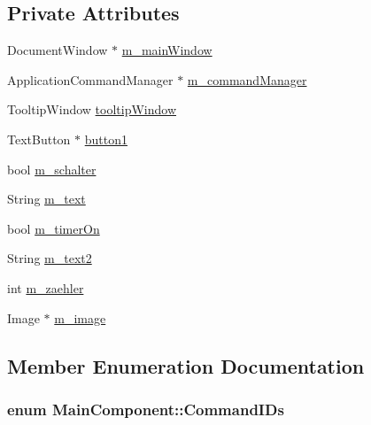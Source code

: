 \begin{CompactItemize}
\subsection*{Private Attributes}
\begin{CompactItemize}
\item 
DocumentWindow $\ast$ \hyperlink{class_main_component_0b3169c9c56934a40ddd86da63ed718f}{m\_\-mainWindow}
\item 
ApplicationCommandManager $\ast$ \hyperlink{class_main_component_a86edd452d1fcbf0528180809f26aefe}{m\_\-commandManager}
\item 
TooltipWindow \hyperlink{class_main_component_f44fee61fe0067ea2d901700a145e188}{tooltipWindow}
\item 
TextButton $\ast$ \hyperlink{class_main_component_b5d3edf82637368286e4a3785e8ebe2a}{button1}
\item 
bool \hyperlink{class_main_component_b98d304d55eabd66ae7bbc0ac3a1a424}{m\_\-schalter}
\item 
String \hyperlink{class_main_component_6f2ff91585d36c8b87e8a7429d792336}{m\_\-text}
\item 
bool \hyperlink{class_main_component_8b79fd199c028bd5a65cbde55fd8757c}{m\_\-timerOn}
\item 
String \hyperlink{class_main_component_5a12f8a9b7495d7525ed8973a06f7110}{m\_\-text2}
\item 
int \hyperlink{class_main_component_40397f7596332f66dac5fb01e72af12e}{m\_\-zaehler}
\item 
Image $\ast$ \hyperlink{class_main_component_2119cdf409e57b888e15b41f3b43e70b}{m\_\-image}
\end{CompactItemize}


\subsection{Member Enumeration Documentation}
\hypertarget{class_main_component_9d7ddc68ebc8f05ba8c6004bd2b538f7}{
\subsubsection[{CommandIDs}]{\setlength{\rightskip}{0pt plus 5cm}enum {\bf MainComponent::CommandIDs}}}
\label{class_main_component_9d7ddc68ebc8f05ba8c6004bd2b538f7}



\end{CompactItemize}
